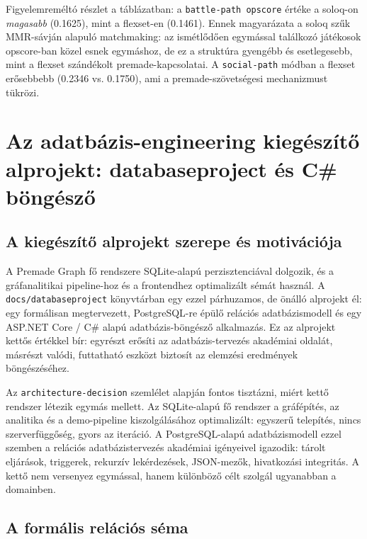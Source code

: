 ﻿\documentclass[a4paper,12pt]{report}
\begin{document}
Figyelemreméltó részlet a táblázatban: a \texttt{battle-path opscore} értéke a soloq-on \emph{magasabb} (0.1625), mint a flexset-en (0.1461). Ennek magyarázata a soloq szűk MMR-sávján alapuló matchmaking: az ismétlődően egymással találkozó játékosok opscore-ban közel esnek egymáshoz, de ez a struktúra gyengébb és esetlegesebb, mint a flexset szándékolt premade-kapcsolatai. A \texttt{social-path} módban a flexset erősebbebb (0.2346 vs. 0.1750), ami a premade-szövetségesi mechanizmust tükrözi.

\chapter{Az adatbázis-engineering kiegészítő alprojekt: databaseproject és C\# böngésző}

\section{A kiegészítő alprojekt szerepe és motivációja}

A Premade Graph fő rendszere SQLite-alapú perzisztenciával dolgozik, és a gráfanalitikai pipeline-hoz és a frontendhez optimalizált sémát használ. A \texttt{docs/databaseproject} könyvtárban egy ezzel párhuzamos, de önálló alprojekt él: egy formálisan megtervezett, PostgreSQL-re épülő relációs adatbázismodell és egy ASP.NET Core / C\# alapú adatbázis-böngésző alkalmazás. Ez az alprojekt kettős értékkel bír: egyrészt erősíti az adatbázis-tervezés akadémiai oldalát, másrészt valódi, futtatható eszközt biztosít az elemzési eredmények böngészéséhez.

Az \texttt{architecture-decision} szemlélet alapján fontos tisztázni, miért kettő rendszer létezik egymás mellett. Az SQLite-alapú fő rendszer a gráfépítés, az analitika és a demo-pipeline kiszolgálásához optimalizált: egyszerű telepítés, nincs szerverfüggőség, gyors az iteráció. A PostgreSQL-alapú adatbázismodell ezzel szemben a relációs adatbázistervezés akadémiai igényeivel igazodik: tárolt eljárások, triggerek, rekurzív lekérdezések, JSON-mezők, hivatkozási integritás. A kettő nem versenyez egymással, hanem különböző célt szolgál ugyanabban a domainben.

\section{A formális relációs séma}
\end{document}
